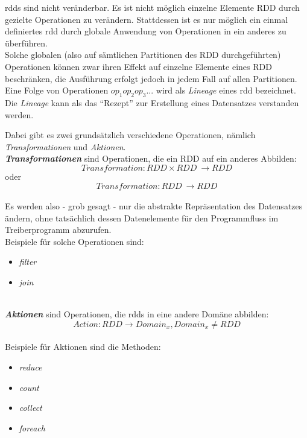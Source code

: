 \Glspl{rdd} sind nicht veränderbar. Es ist nicht möglich einzelne Elemente \gls{RDD} durch gezielte Operationen zu verändern. Stattdessen ist es nur möglich ein einmal definiertes \gls{rdd} durch globale Anwendung von Operationen in ein anderes zu überführen.\\
Solche globalen (also auf sämtlichen Partitionen des \gls{RDD} durchgeführten) Operationen können zwar ihren Effekt auf einzelne Elemente eines \gls{RDD} beschränken, die Ausführung erfolgt jedoch in jedem Fall auf allen Partitionen.\\

Eine Folge von Operationen $op_1op_2op_3...$ wird als \textit{Lineage} eines \gls{rdd} bezeichnet. Die \textit{Lineage} kann als das "`Rezept"' zur Erstellung eines Datensatzes verstanden werden.

Dabei gibt es zwei grundsätzlich verschiedene Operationen, nämlich \textit{Transformationen} und \textit{Aktionen}.\\

\textbf{\textit{Transformationen}} sind Operationen, die ein \gls{RDD} auf ein anderes Abbilden:\\
\[Transformation: RDD \times RDD\ \longrightarrow RDD\]
oder
\[Transformation: RDD\ \longrightarrow RDD\]
\\
Es werden also - grob gesagt - nur die abstrakte Repräsentation des Datensatzes ändern, ohne tatsächlich dessen Datenelemente für den Programmfluss im Treiberprogramm abzurufen.\\
Beispiele für solche Operationen sind:
\begin{itemize}
	\item \textit{filter}
	\item \textit{join}
\end{itemize}\\

\textbf{\textit{Aktionen}} sind Operationen, die \glspl{rdd} in eine andere Domäne abbilden:\\
\[Action: RDD \longrightarrow Domain_x, Domain_x \neq RDD\]
\\
Beispiele für Aktionen sind die Methoden:
\begin{itemize}
	\item \textit{reduce}
	\item \textit{count}
	\item \textit{collect}
	\item \textit{foreach}
\end{itemize}\\


